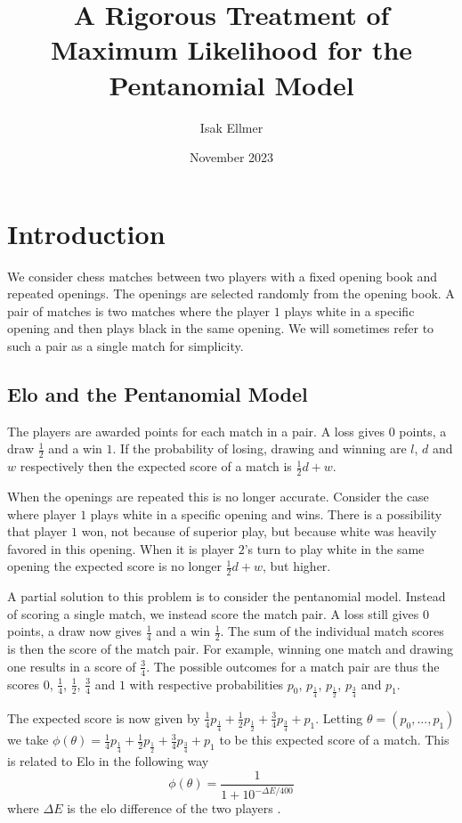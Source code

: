 \documentclass{article}
\title{A Rigorous Treatment of Maximum Likelihood for the Pentanomial Model}
\author{Isak Ellmer}
\date{November 2023}
\theoremstyle{plain}
\theoremstyle{definition}
\begin{document}
\maketitle

\section{Introduction}
We consider chess matches between two players with a fixed opening book and repeated openings.
The openings are selected randomly from the opening book. A pair of matches is two matches where
the player $1$ plays white in a specific opening and then plays black in the same opening.
We will sometimes refer to such a pair as a single match for simplicity.

\subsection{Elo and the Pentanomial Model}
The players are awarded points for each match in a pair. A loss gives $0$ points,
a draw $\frac12$ and a win $1$. If the probability of losing, drawing and winning
are $l$, $d$ and $w$ respectively then the expected score of a match is $\frac12d+w$.

When the openings are repeated this is no longer accurate. Consider the case where
player $1$ plays white in a specific opening and wins. There is a possibility that
player $1$ won, not because of superior play, but because white was heavily favored
in this opening. When it is player $2$'s turn to play white in the same opening
the expected score is no longer $\frac12d+w$, but higher.

A partial solution to this problem is to consider the pentanomial model. Instead of
scoring a single match, we instead score the match pair. A loss still gives $0$ points,
a draw now gives $\frac14$ and a win $\frac12$. The sum of the individual match scores
is then the score of the match pair. For example, winning one match and drawing one results
in a score of $\frac34$. The possible outcomes for a match pair are thus the scores
$0$, $\frac14$, $\frac12$, $\frac34$ and $1$ with respective probabilities
$p_0$, $p_\frac14$, $p_\frac12$, $p_\frac34$ and $p_1$.

The expected score is now given by $\frac14p_\frac14+\frac12p_\frac12+\frac34p_\frac34+p_1$.
Letting $\theta=(p_0,...,p_1)$ we take $\phi(\theta)=\frac14p_\frac14+\frac12p_\frac12+
\frac34p_\frac34+p_1$ to be this expected score of a match.
This is related to Elo in the following way
$$\phi(\theta)=\frac1{1+10^{-\Delta E/400}}$$
where $\Delta E$ is the elo difference of the two players \cite{wikipedia_elo}.
\end{document}
